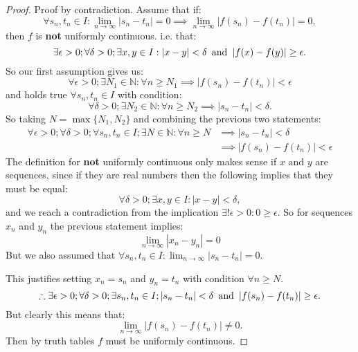 \begin{enumerate}
\begin{proof}
        Proof by contradiction. Assume that if:
        $$\forall s_n, t_n \in I: \lim_{n\rightarrow\infty}|s_n - t_n|=0\implies
        \lim_{n\rightarrow\infty}|f(s_n) - f(t_n)|=0,$$
        then $f$ is \textbf{not} uniformly continuous. i.e. that:
        $$\exists\epsilon>0; \forall\delta>0;\exists x, y\in I: |x-y|<\delta
        \hspace{0.07in}\text{and}\hspace{0.07in}|f(x)-f(y)|\geq\epsilon.$$
        So our first assumption gives us:
        $$\forall\epsilon>0; \exists N_1\in\mathbb{N}:
        \forall n\geq N_1\implies|f(s_n)-f(t_n)|<\epsilon$$
        and holds true $\forall s_n, t_n\in I$ with condition:
        $$\forall\delta>0; \exists N_2\in\mathbb{N}:
        \forall n\geq N_2\implies|s_n - t_n|<\delta.$$
        So taking $N=\max\{N_1, N_2\}$ and combining the previous two statements:
        \begin{align*}
            \forall\epsilon>0; \forall\delta>0; \forall s_n, t_n \in I;
            \exists N\in\mathbb{N}: \forall n\geq N
            &\implies |s_n - t_n|<\delta \\
            &\implies |f(s_n)-f(t_n)|<\epsilon
        \end{align*}
        The definition for \textbf{not} uniformly continuous only makes sense if $x$ and $y$ are sequences, since if they are real numbers then the following implies that they must be equal:
        $$\forall\delta>0; \exists x, y\in I : |x-y|<\delta,$$
        and we reach a contradiction from the implication 
        $\exists!\epsilon>0: 0\geq\epsilon$. So for sequences $x_n$ and $y_n$ the previous statement implies:
        $$\lim_{n\rightarrow\infty}|x_n-y_n|=0$$
        But we also assumed that $\forall s_n, t_n \in I: \displaystyle\lim_{n\rightarrow\infty}|s_n - t_n|=0$.
        
        This justifies setting $x_n=s_n$ and $y_n=t_n$ with condition $\forall n\geq N$.
        $$\therefore\exists\epsilon>0; \forall\delta>0;\exists s_n, t_n\in I; |s_n - t_n|<\delta
        \hspace{0.07in}\text{and}\hspace{0.07in}|f(s_n)-f(t_n)|\geq\epsilon.$$
        But clearly this means that:
        $$\lim_{n\rightarrow\infty}|f(s_n) - f(t_n)|\neq0.$$
        Then by truth tables $f$ must be uniformly continuous.
    \end{proof}
    
\end{enumerate}